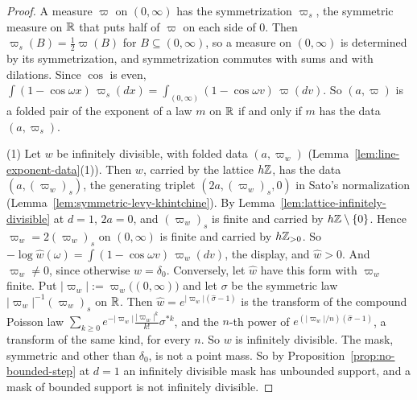 \begin{proof}
\leanok
{}
A measure $\varpi$ on $(0,\infty)$ has the symmetrization $\varpi_s$, the symmetric measure on
$\mathbb{R}$ that puts half of $\varpi$ on each side of $0$. Then $\varpi_s(B) = \tfrac12\varpi(B)$ for
$B \subseteq (0,\infty)$, so a measure on $(0,\infty)$ is determined by its symmetrization, and
symmetrization commutes with sums and with dilations. Since $\cos$ is even,
$\int(1 - \cos\omega x)\,\varpi_s(dx) = \int_{(0,\infty)}(1 - \cos\omega v)\,\varpi(dv)$. So
$(a, \varpi)$ is a folded pair of the exponent of a law $m$ on $\mathbb{R}$ if and only if $m$ has the
data $(a, \varpi_s)$.

(1) Let $w$ be infinitely divisible, with folded data $(a, \varpi_w)$
(Lemma~\ref{lem:line-exponent-data}(1)). Then $w$, carried by the lattice $h\mathbb{Z}$, has the data
$(a, (\varpi_w)_s)$, the generating triplet $(2a, (\varpi_w)_s, 0)$ in Sato's normalization
(Lemma~\ref{lem:symmetric-levy-khintchine}). By
Lemma~\ref{lem:lattice-infinitely-divisible} at $d = 1$, $2a = 0$, and $(\varpi_w)_s$ is finite and
carried by $h\mathbb{Z} \setminus \{0\}$. Hence $\varpi_w = 2(\varpi_w)_s$ on $(0,\infty)$ is finite and
carried by $h\mathbb{Z}_{>0}$. So $-\log\widehat w(\omega) = \int(1 - \cos\omega v)\,\varpi_w(dv)$, the
display, and $\widehat w > 0$. And $\varpi_w \ne 0$, since otherwise $w = \delta_0$.
Conversely, let $\widehat w$ have this form with $\varpi_w$ finite. Put
$|\varpi_w| := \varpi_w\bigl((0,\infty)\bigr)$ and let $\sigma$ be the symmetric law
$|\varpi_w|^{-1}(\varpi_w)_s$ on $\mathbb{R}$. Then $\widehat w = e^{|\varpi_w|(\widehat\sigma - 1)}$
is the transform of the compound Poisson law
$\sum_{k \ge 0}e^{-|\varpi_w|}\tfrac{|\varpi_w|^k}{k!}\sigma^{*k}$, and the $n$-th power of
$e^{(|\varpi_w|/n)(\widehat\sigma - 1)}$, a transform of the same kind, for every $n$. So $w$ is
infinitely divisible. The mask, symmetric and other than $\delta_0$, is not a point mass. So by
Proposition~\ref{prop:no-bounded-step} at $d = 1$ an infinitely divisible mask has unbounded
support, and a mask of bounded support is not infinitely divisible.


\end{proof}
